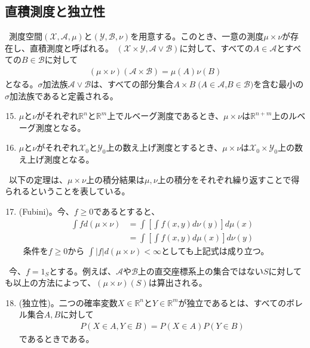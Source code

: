 \documentclass[a4j,12pt]{jarticle}
\begin{document}
\subsection{直積測度と独立性}
\ 測度空間$(\mathcal{X},\mathcal{A},\mu)$と$(\mathcal{Y},\mathcal{B},\nu)$を用意する。このとき、一意の測度$\mu \times \nu$が存在し、直積測度と呼ばれる。
$(\mathcal{X}\times\mathcal{Y}, \mathcal{A} \lor \mathcal{B})$に対して、すべての$A \in \mathcal{A}$とすべての$B \in \mathcal{B}$に対して
\begin{align*}
(\mu \times \nu)(\mathcal{A} \times \mathcal{B}) = \mu(A)\nu(B)
\end{align*}
となる。$\sigma$加法族$\mathcal{A} \lor \mathcal{B}$は、すべての部分集合$A \times B \; (A \in \mathcal{A}$,$B \in \mathcal{B})$を含む最小の$\sigma$加法族であると定義される。
\begin{enumerate}[label=例1.\arabic*]
\setcounter{enumi}{14}
\item $\mu$と$\nu$がそれぞれ$\mathbb{R}^{n}$と$\mathbb{R}^{m}$上でルベーグ測度であるとき、$\mu \times \nu$は$\mathbb{R}^{n+m}$上のルベーグ測度となる。
\item $\mu$と$\nu$がそれぞれ$\mathcal{X}_{0}$と$\mathcal{Y}_{0}$上の数え上げ測度とするとき、$\mu\times\nu$は$\mathcal{X}_{0}\times\mathcal{Y}_{0}$上の数え上げ測度となる。
\end{enumerate}
\ 以下の定理は、$\mu \times \nu$上の積分結果は$\mu,\nu$上の積分をそれぞれ繰り返すことで得られるということを表している。
\begin{enumerate}[label = 定理1.\arabic*]
\setcounter{enumi}{16}
\item (Fubini)。今、$f \geq 0$であるとすると、
\begin{align*}
\int f d(\mu \times \nu) &= \int \left[\int f (x,y) d\nu(y)\right]d\mu(x) \\
&=  \int \left[\int f (x,y) d\mu(x)\right]d\nu(y)
\end{align*}
\ 条件を$f \geq 0$から $\int |f|d(\mu \times \nu) < \infty$としても上記式は成り立つ。　
\end{enumerate}
\ 今、$ f= 1_{S}$とする。例えば、$\mathcal{A}や\mathcal{B}$上の直交座標系上の集合ではない$S$に対しても以上の方法によって、$(\mu \times \nu)(S)$は算出される。
\begin{enumerate}[label = 定義1.\arabic*]
\setcounter{enumi}{17}
\item(独立性)。二つの確率変数$X \in \mathbb{R}^{n}$と$Y \in \mathbb{R}^{m}$が独立であるとは、すべてのボレル集合$A,B$に対して
\begin{align}
\label{s}
P(X \in A , Y \in B) = P(X \in A)P(Y \in B)
\end{align}
であるときである。
\end{enumerate}
\end{document}
